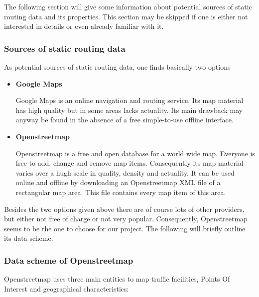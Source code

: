The following section will give some information about potential sources of static routing data and its properties. This section may be skipped if one is either not interested in details or even already familiar with it.

\subsubsection{Sources of static routing data}
 
As potential sources of static routing data, one finds basically two options

\begin{itemize}
 
	\item \textbf{Google Maps}
	
		Google Maps is an online navigation and routing service. Its map material has high quality but in some areas lacks actuality. Its main drawback may anyway be found in the absence of a free simple-to-use offline interface. 
	
	\item \textbf{Openstreetmap}
	
		Openstreetmap is a free and open database for a world wide map. Everyone is free to add, change and remove map items. Consequently its map material varies over a hugh scale in quality, density and actuality. It can be used online and offline by downloading an Openstreetmap XML file of a rectangular map area. This file contains every map item of this area.
  
\end{itemize} 

Besides the two options given above there are of course lots of other providers, but either not free of charge or not very popular. Consequently, Openstreetmap seems to be the one to choose for our project. The following will briefly outline its data scheme.

\subsubsection{Data scheme of Openstreetmap}

Openstreetmap uses three main entities to map traffic facilities, Points Of Interest and geographical characteristics:

